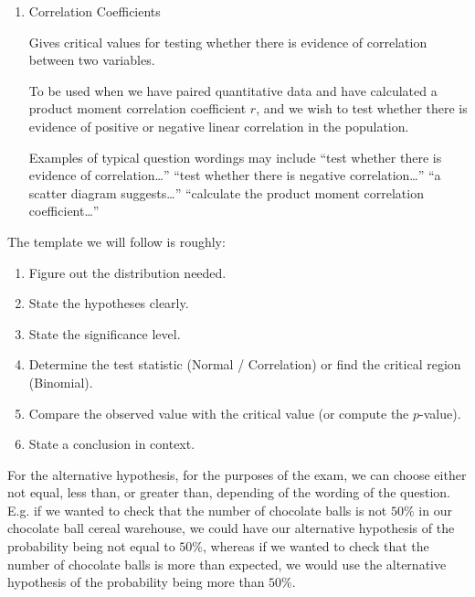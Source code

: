 \begin{enumerate}
    



    \item Correlation Coefficients  
    
    Gives critical values for testing whether there is evidence of correlation between two variables.

    To be used when we have paired quantitative data and have calculated a product moment correlation coefficient $r$, and we wish to test whether there is evidence of positive or negative linear correlation in the population.

    Examples of typical question wordings may include ``test whether there is evidence of correlation\ldots'' ``test whether there is negative correlation\ldots'' ``a scatter diagram suggests\ldots'' ``calculate the product moment correlation coefficient\ldots''
    \end{enumerate}

The template we will follow is roughly:

\begin{enumerate}
    \item Figure out the distribution needed.
    \item State the hypotheses clearly. 
    \item State the significance level.
    \item Determine the test statistic (Normal / Correlation) or find the critical region (Binomial).
    \item Compare the observed value with the critical value (or compute the $p$-value).
    \item State a conclusion in context.
\end{enumerate}

For the alternative hypothesis, for the purposes of the exam, we can choose either not equal, less than, or greater than, depending of the wording of the question. 
E.g. if we wanted to check that the number of chocolate balls is not $50\%$ in our chocolate ball cereal warehouse, we could have our alternative hypothesis of the probability being not equal to $50\%$, 
whereas if we wanted to check that the number of chocolate balls is more than expected, we would use the alternative hypothesis of the probability being more than $50\%$.

